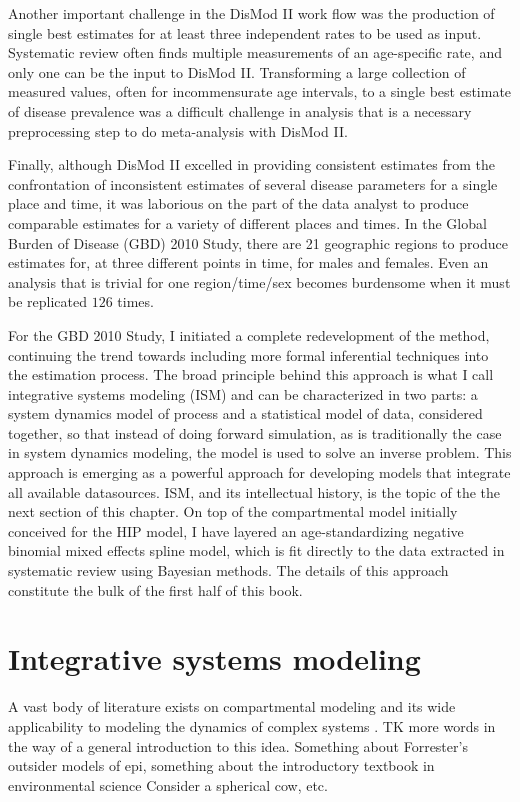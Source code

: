 Another important challenge in the DisMod II work flow was the
production of single best estimates for at least three independent
rates to be used as input.  Systematic review often finds multiple
measurements of an age-specific rate, and only one can be the input to
DisMod II.  Transforming a large collection of measured values, often
for incommensurate age intervals, to a single best estimate of disease
prevalence was a difficult challenge in analysis that is a necessary
preprocessing step to do meta-analysis with DisMod II.

Finally, although DisMod II excelled in providing consistent estimates
from the confrontation of inconsistent estimates of several disease
parameters for a single place and time, it was laborious on the part
of the data analyst to produce comparable estimates for a variety of
different places and times. In the Global Burden of Disease (GBD) 2010
Study, there are 21 geographic regions to produce estimates for, at
three different points in time, for males and females. Even an
analysis that is trivial for one region/time/sex becomes burdensome
when it must be replicated $126$ times.

For the GBD 2010 Study, I initiated a complete redevelopment of the method,
continuing the trend towards including more formal
inferential techniques into the estimation process.  The broad
principle behind this approach is what I call integrative systems modeling (ISM) and can
be characterized in two parts: a system dynamics model of process and a
statistical model of data, considered together, so that instead of doing forward simulation, as is
traditionally the case in system dynamics modeling, the model
is used to solve an inverse problem. This approach is emerging as a powerful approach for
developing models that integrate all available datasources.  ISM, and
its intellectual history, is the topic of the the next section of this
chapter.  On top of the compartmental model initially conceived for
the HIP model, I have layered an age-standardizing negative binomial mixed effects
spline model, which is fit directly to the data extracted in
systematic review using Bayesian methods.  The details of this
approach constitute the bulk of the first half of this book.

\section{Integrative systems modeling}
\label{intro-ism}
A vast body of literature exists on compartmental modeling and its
wide applicability to modeling the dynamics of complex systems
\cite{Forrester_Principles_1968, Meadows_Thinking_2008,
  Bossel_Systems_2007}.  TK more words in the way of a general
introduction to this idea.  Something about Forrester's outsider
models of epi, something about the introductory textbook in
environmental science Consider a spherical cow, etc.

